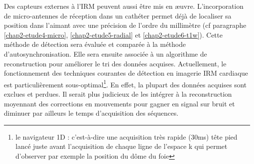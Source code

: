 Des capteurs externes à l’IRM peuvent aussi être mis en {\color{red} æ}uvre. L’incorporation de micro-antennes de réception dans un cathéter permet déjà de localiser sa position dans l’aimant avec une précision de l’ordre du millimètre (cf paragraphe \ref{chap2-etude4-micro}, \ref{chap2-etude5-radial} et \ref{chap2-etude6-t1w}). Cette méthode de détection sera évaluée et comparée à la méthode d’autosynchronisation. Elle sera ensuite associée à un algorithme de reconstruction pour améliorer le tri des données acquises. Actuellement, le fonctionnement des techniques courantes de détection en imagerie IRM cardiaque est particulièrement sous-optimal\footnote{le navigateur 1D : c’est-à-dire une acquisition très rapide (30ms) tête pied lancé juste avant l’acquisition de chaque ligne de l’espace k qui permet d’observer par exemple la position du dôme du foie}. En effet, la plupart des données acquises sont exclues et perdues. Il serait plus judicieux de les intégrer à la reconstruction moyennant des corrections en mouvements pour gagner en signal sur bruit et diminuer par ailleurs le temps d’acquisition des séquences.\\
